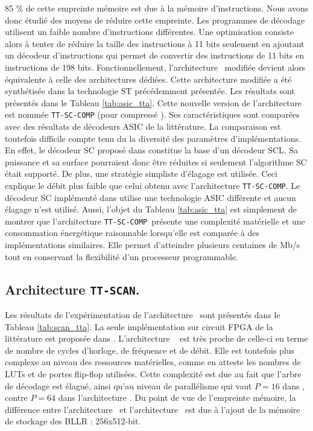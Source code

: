 85 \% de cette empreinte mémoire est due à la mémoire d'instructions. Nous avons donc étudié des moyens de réduire cette empreinte. Les programmes de décodage utilisent un faible nombre d'instructions différentes. Une optimisation consiste alors à tenter de réduire la taille des instructions à 11 bits seulement en ajoutant un décodeur d'instructions qui permet de convertir des instructions de 11 bits en instructions de 198 bits. Fonctionnellement, l'architecture \TTSC~modifiée devient alors équivalente à celle des architectures dédiées. Cette architecture modifiée a été synthétisée dans la technologie ST précédemment présentée. Les résultats sont présentés dans le Tableau \ref{tab:asic_tta}. Cette nouvelle version de l'architecture est nommée \texttt{TT-SC-COMP} (pour \og compressé \fg). Ses caractéristiques sont comparées avec des résultats de décodeurs ASIC de la littérature. La comparaison est toutefois difficile compte tenu du la diversité des paramètres d'implémentations. En effet, le décodeur SC proposé dans \cite{giard_polarbear:_2017} constitue la base d'un décodeur SCL. Sa puissance et sa surface pourraient donc être réduites si seulement l'algorithme SC était supporté. De plus, une stratégie simpliste d'élagage est utilisée. Ceci explique le débit plus faible que celui obtenu avec l'architecture \texttt{TT-SC-COMP}. Le décodeur SC implémenté dans \cite{mishra_successive_2012} utilise une technologie ASIC différente et aucun élagage n'est utilisé. Aussi, l'objet du Tableau \ref{tab:asic_tta} est simplement de montrer que l’architecture \texttt{TT-SC-COMP}~présente une complexité matérielle et une consommation énergétique raisonnable lorsqu'elle est comparée à des implémentations similaires. Elle permet d'atteindre plusieurs centaines de Mb/s tout en conservant la flexibilité d'un processeur programmable.


\subsection{Architecture \texttt{TT-SCAN}.}

Les résultats de l'expérimentation de l'architecture \TTSCAN~sont présentés dans le Tableau \ref{tab:scan_tta}. La seule implémentation sur circuit FPGA de la littérature est proposée dans \cite{berhault_hardware_2015}. L'architecture \TTSCAN~ est très proche de celle-ci en terme de nombre de cycles d'horloge, de fréquence et de débit. Elle est toutefois plus complexe au niveau des ressources matérielles, comme en atteste les nombres de LUTs et de portes flip-flop utilisées. Cette complexité est due au fait que l'arbre de décodage est élagué, ainsi qu'au niveau de parallélisme qui vaut $P=16$ dans \cite{berhault_hardware_2015}, contre $P=64$ dans l'architecture \TTSCAN. Du point de vue de l'empreinte mémoire, la différence entre l'architecture \TTSC~et l'architecture \TTSCAN~est due à l'ajout de la mémoire de stockage des BLLR : 256x512-bit.

